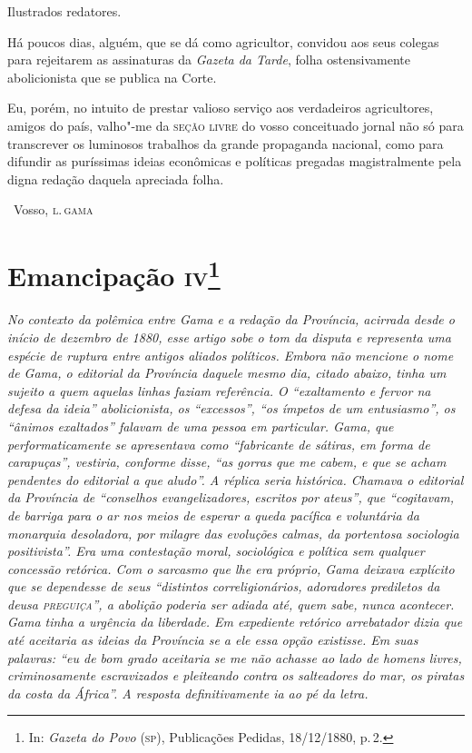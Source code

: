 Ilustrados redatores.

Há poucos dias, alguém, que se dá como agricultor, convidou aos seus
colegas para rejeitarem as assinaturas da \emph{Gazeta da Tarde}, folha
ostensivamente abolicionista que se publica na Corte.

Eu, porém, no intuito de prestar valioso serviço aos verdadeiros
agricultores, amigos do país, valho"-me da \textsc{seção livre} do vosso
conceituado jornal não só para transcrever os luminosos trabalhos da
grande propaganda nacional, como para difundir as puríssimas ideias
econômicas e políticas pregadas magistralmente pela digna redação
daquela apreciada folha.

\bigskip

\hfill\ Vosso, \textsc{l.\,gama}


\chapter{Emancipação \textsc{iv}\footnote[*]{In: \emph{Gazeta do Povo} (\textsc{sp}), Publicações Pedidas, 18/12/1880, p.\,2.}} %

\begin{flushleft}
{\footnotesize\itshape
No contexto da polêmica entre Gama e a redação da Província,
acirrada desde o início de dezembro de 1880, esse artigo sobe o tom da
disputa e representa uma espécie de ruptura entre antigos aliados
políticos. Embora não mencione o nome de Gama, o editorial da Província
daquele mesmo dia, citado abaixo, tinha um sujeito
a quem aquelas linhas faziam referência. O
``exaltamento e fervor na defesa da ideia'' abolicionista, os ``excessos'',
``os ímpetos de um entusiasmo'', os ``ânimos exaltados'' falavam de uma
pessoa em particular. Gama, que performaticamente se apresentava como
``fabricante de sátiras, em forma de carapuças'', vestiria, conforme
disse, ``as gorras que me cabem, e que se acham pendentes do editorial a
que aludo''. A réplica seria histórica. Chamava o editorial da Província
de ``conselhos evangelizadores, escritos por ateus'', que ``cogitavam, de
barriga para o ar nos meios de esperar a queda pacífica e voluntária da
monarquia desoladora, por milagre das evoluções calmas, da portentosa
sociologia positivista''. Era uma contestação moral, sociológica e
política sem qualquer concessão retórica. Com o sarcasmo que lhe era
próprio, Gama deixava explícito que se dependesse de seus ``distintos
correligionários, adoradores prediletos da deusa \textsc{preguiça}'', a abolição
poderia ser adiada até, quem sabe, nunca acontecer.
Gama tinha a urgência da liberdade. Em expediente retórico arrebatador
dizia que até aceitaria as ideias da Província se a ele essa opção
existisse. Em suas palavras: ``eu de bom grado aceitaria se me não
achasse ao lado de homens livres, criminosamente escravizados e
pleiteando contra os salteadores do mar, os piratas da costa da África''.
A resposta definitivamente ia ao pé da letra. }
\end{flushleft}

